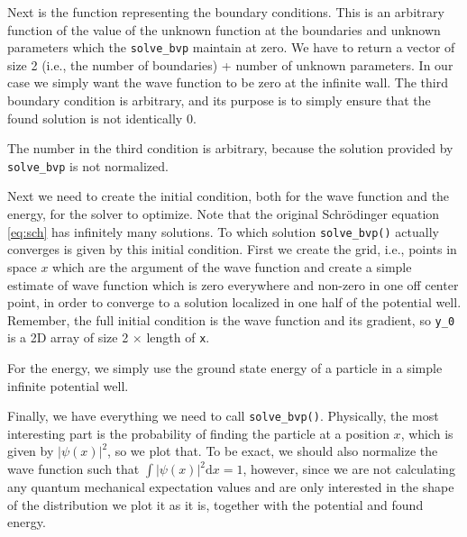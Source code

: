 \documentclass{article}
\newcommand{\dd}{\ensuremath{\mathrm{d}}}
\newcommand{\ls}[1]{\lstinline{#1}}
\begin{document}
Next is the function representing the boundary conditions. This is an arbitrary function of the value of the unknown function at the boundaries and unknown parameters which the \ls{solve_bvp} maintain at zero. We have to return a vector of size 2 (i.e., the number of boundaries) + number of unknown parameters. In our case we simply want the wave function to be zero at the infinite wall. The third boundary condition is arbitrary, and its purpose is to simply ensure that the found solution is not identically 0.

The number in the third condition is arbitrary, because the solution provided by \ls{solve_bvp} is not normalized.

Next we need to create the initial condition, both for the wave function and the energy, for the solver to optimize. Note that the original Schrödinger equation \eqref{eq:sch} has infinitely many solutions. To which solution \ls{solve_bvp()} actually converges is given by this initial condition. First we create the grid, i.e., points in space $x$ which are the argument of the wave function and create a simple estimate of wave function which is zero everywhere and non-zero in one off center point, in order to converge to a solution localized in one half of the potential well. Remember, the full initial condition is the wave function and its gradient, so \ls{y_0} is a 2D array of size 2 $\times$ length of \ls{x}.


For the energy, we simply use the ground state energy of a particle in a simple infinite potential well.


Finally, we have everything we need to call \ls{solve_bvp()}. Physically, the most interesting part is the probability of finding the particle at a position $x$, which is given by $|\psi(x)|^2$, so we plot that. To be exact, we should also normalize the wave function such that $\int |\psi(x)|^2 \dd x = 1$, however, since we are not calculating any quantum mechanical expectation values and are only interested in the shape of the distribution we plot it as it is, together with the potential and found energy.


\end{document}
